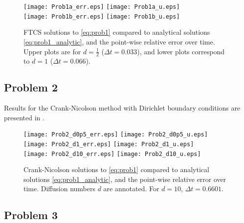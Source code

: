 \documentclass[11pt]{article}
\begin{document}
\begin{figure}[h!]
\begin{center}
\texttt{[image: Prob1a\_err.eps]}
\hspace*{-0.2cm}
\texttt{[image: Prob1a\_u.eps]}
\\
\texttt{[image: Prob1b\_err.eps]}
\hspace*{-0.2cm}
\texttt{[image: Prob1b\_u.eps]}
\\[-0.5cm]
\caption{FTCS solutions to \eqref{eq:prob1} compared to analytical solutions \eqref{eq:prob1_analytic}, and the point-wise relative error over time. Upper plots are for $d=\tfrac{1}{2}$ ($\Delta t = 0.033$), and lower plots correspond to $d=1$ ($\Delta t = 0.066$).}
\label{fig:Prob1}
\end{center}
\end{figure}

\subsection{Problem 2}

Results for the Crank-Nicolson method with Dirichlet boundary conditions are presented in .

\begin{figure}[h!]
\begin{center}
\texttt{[image: Prob2\_d0p5\_err.eps]}
\hspace*{-0.2cm}
\texttt{[image: Prob2\_d0p5\_u.eps]}
\\
\texttt{[image: Prob2\_d1\_err.eps]}
\hspace*{-0.2cm}
\texttt{[image: Prob2\_d1\_u.eps]}
\\
\texttt{[image: Prob2\_d10\_err.eps]}
\hspace*{-0.2cm}
\texttt{[image: Prob2\_d10\_u.eps]}
\\[-0.5cm]
\caption{Crank-Nicolson solutions to \eqref{eq:prob1} compared to analytical solutions \eqref{eq:prob1_analytic}, and the point-wise relative error over time. Diffusion numbers $d$ are annotated. For $d = 10$, $\Delta t = 0.6601$.}
\label{fig:Prob2}
\end{center}
\end{figure}

\subsection{Problem 3}
\end{document}
